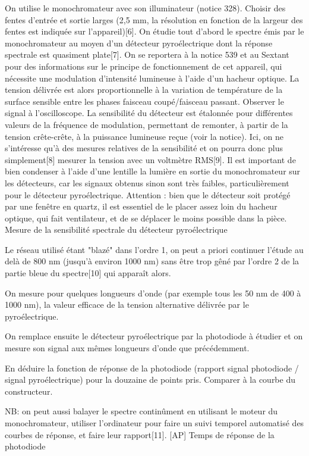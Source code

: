 \documentclass{article}%
\begin{document}
On utilise le monochromateur avec son illuminateur (notice 328). Choisir des fentes d'entrée et sortie larges (2,5 mm, la résolution en fonction de la largeur des fentes est indiquée sur l'appareil)[6]. On étudie tout d'abord le spectre émis par le monochromateur au moyen d'un détecteur pyroélectrique dont la réponse spectrale est quasiment plate[7]. On se reportera à la notice 539 et au Sextant pour des informations sur le principe de fonctionnement de cet appareil, qui nécessite une modulation d'intensité lumineuse à l'aide d'un hacheur optique. La tension délivrée est alors proportionnelle à la variation de température de la surface sensible entre les phases faisceau coupé/faisceau passant. Observer le signal à l'oscilloscope. La sensibilité du détecteur est étalonnée pour différentes valeurs de la fréquence de modulation, permettant de remonter, à partir de la tension crête-crête, à la puissance lumineuse reçue (voir la notice). Ici, on ne s'intéresse qu'à des mesures relatives de la sensibilité et on pourra donc plus simplement[8] mesurer la tension avec un voltmètre RMS[9]. Il est important de bien condenser à l'aide d'une lentille la lumière en sortie du monochromateur sur les détecteurs, car les signaux obtenus sinon sont très faibles, particulièrement pour le détecteur pyroélectrique.
Attention : bien que le détecteur soit protégé par une fenêtre en quartz, il est essentiel de le placer assez loin du hacheur optique, qui fait ventilateur, et de se déplacer le moins possible dans la pièce.
Mesure de la sensibilité spectrale du détecteur pyroélectrique

Le réseau utilisé étant "blazé" dans l'ordre 1, on peut a priori continuer l'étude au delà de 800 nm (jusqu'à environ 1000 nm) sans être trop gêné par l'ordre 2 de la partie bleue du spectre[10] qui apparaît alors.

On mesure pour quelques longueurs d'onde (par exemple tous les 50 nm de 400 à 1000 nm), la valeur efficace de la tension alternative délivrée par le pyroélectrique.

On remplace ensuite le détecteur pyroélectrique par la photodiode à étudier et on mesure son signal aux mêmes longueurs d'onde que précédemment.

En déduire la fonction de réponse de la photodiode (rapport signal photodiode / signal pyroélectrique) pour la douzaine de points pris. Comparer à la courbe du constructeur.

NB: on peut aussi balayer le spectre continûment en utilisant le moteur du monochromateur, utiliser l'ordinateur pour faire un suivi temporel automatisé des courbes de réponse, et faire leur rapport[11].
[AP] Temps de réponse de la photodiode
\end{document}

